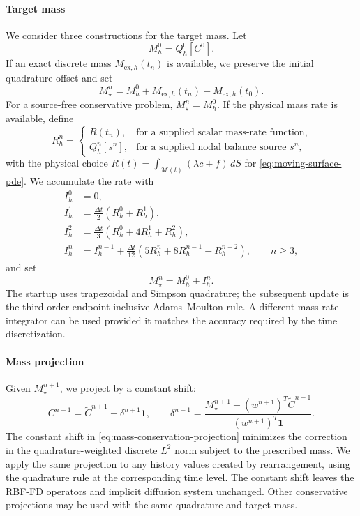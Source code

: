 \documentclass[a4paper,fleqn]{cas-sc}
\begin{document}
\paragraph{Target mass}
We consider three constructions for the target mass.  Let
\[
  M_h^0=Q_h^0[C^0].
\]
If an exact discrete mass $M_{\mathrm{ex},h}(t_n)$ is available, we preserve
the initial quadrature offset and set
\begin{equation}
  M_\star^n
  =
  M_h^0
  +M_{\mathrm{ex},h}(t_n)
  -M_{\mathrm{ex},h}(t_0).
  \label{eq:exact-discrete-mass-target}
\end{equation}
For a source-free conservative problem, $M_\star^n=M_h^0$.  If the physical
mass rate is available, define
\begin{equation}
  R_h^n
  =
  \begin{cases}
    R(t_n), & \text{for a supplied scalar mass-rate function},\\
    Q_h^n[s^n], & \text{for a supplied nodal balance source }s^n,
  \end{cases}
  \label{eq:discrete-mass-rate}
\end{equation}
with the physical choice
$R(t)=\int_{\mathcal M(t)}(\lambda c+f)\,dS$ for
\eqref{eq:moving-surface-pde}.  We accumulate the rate with
\begin{align}
  I_h^0 &= 0, \nonumber\\
  I_h^1 &= \frac{\Delta t}{2}(R_h^0+R_h^1), \nonumber\\
  I_h^2 &= \frac{\Delta t}{3}(R_h^0+4R_h^1+R_h^2), \nonumber\\
  I_h^n &= I_h^{n-1}
  +\frac{\Delta t}{12}(5R_h^n+8R_h^{n-1}-R_h^{n-2}),
  \qquad n\geq3,
  \label{eq:multistep-mass-integral}
\end{align}
and set
\begin{equation}
  M_\star^n=M_h^0+I_h^n.
  \label{eq:discrete-mass-target}
\end{equation}
The startup uses trapezoidal and Simpson quadrature; the subsequent update is
the third-order endpoint-inclusive Adams--Moulton rule.  A different mass-rate
integrator can be used provided it matches the accuracy required by the time
discretization.

\paragraph{Mass projection}
Given $M_\star^{n+1}$, we project by a constant shift:
\begin{equation}
  C^{n+1}
  =
  \widetilde C^{n+1}
  +\delta^{n+1}\bm 1,
  \qquad
  \delta^{n+1}
  =
  \frac{M_\star^{n+1}-(w^{n+1})^T\widetilde C^{n+1}}
       {(w^{n+1})^T\bm 1}.
  \label{eq:mass-conservation-projection}
\end{equation}
The constant shift in \eqref{eq:mass-conservation-projection} minimizes the
correction in the quadrature-weighted discrete $L^2$ norm subject to the
prescribed mass.  We apply the same projection to any
history values created by rearrangement, using the quadrature rule at the
corresponding time level.  The constant shift leaves the RBF-FD operators and implicit diffusion system
unchanged.  Other conservative projections may be used with the same
quadrature and target mass.
\end{document}

